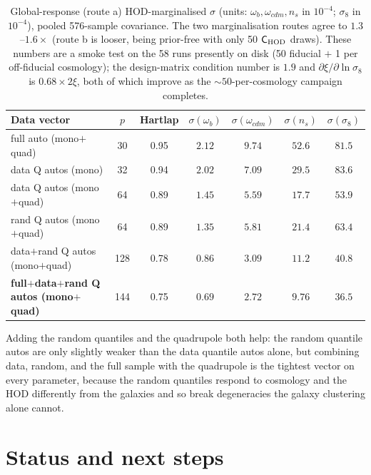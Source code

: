 \documentclass[11pt]{article}
\begin{document}
\begin{table}[ht]
\centering
\begin{tabular}{lcccccc}
\toprule
Data vector & $p$ & Hartlap & $\sigma(\omega_b)$ & $\sigma(\omega_{cdm})$ & $\sigma(n_s)$ & $\sigma(\sigma_8)$ \\
\midrule
full auto (mono$+$quad)                 & 30  & 0.95 & $2.12$ & $9.74$ & $52.6$ & $81.5$ \\
data Q autos (mono)                     & 32  & 0.94 & $2.02$ & $7.09$ & $29.5$ & $83.6$ \\
data Q autos (mono$+$quad)              & 64  & 0.89 & $1.45$ & $5.59$ & $17.7$ & $53.9$ \\
rand Q autos (mono$+$quad)              & 64  & 0.89 & $1.35$ & $5.81$ & $21.4$ & $63.4$ \\
data$+$rand Q autos (mono$+$quad)       & 128 & 0.78 & $0.86$ & $3.09$ & $11.2$ & $40.8$ \\
\textbf{full$+$data$+$rand Q autos (mono$+$quad)} & 144 & 0.75 & $\mathbf{0.69}$ & $\mathbf{2.72}$ & $\mathbf{9.76}$ & $\mathbf{36.5}$ \\
\bottomrule
\end{tabular}
\caption{Global-response (route a) HOD-marginalised $\sigma$ (units:
$\omega_b,\omega_{cdm},n_s$ in $10^{-4}$; $\sigma_8$ in $10^{-4}$), pooled
576-sample covariance.  The two marginalisation routes agree to
$1.3$--$1.6\times$ (route b is looser, being prior-free with only 50
$\mathsf{C}_{\rm HOD}$ draws).  These numbers are a smoke test on the 58
runs presently on disk (50 fiducial $+$ 1 per off-fiducial cosmology); the
design-matrix condition number is $1.9$ and $\partial\xi/\partial
\ln\sigma_8$ is $0.68\times 2\xi$, both of which improve as the
$\sim 50$-per-cosmology campaign completes.}
\label{tab:global}
\end{table}

Adding the random quantiles and the quadrupole both help: the random
quantile autos are only slightly weaker than the data quantile autos alone,
but combining data, random, and the full sample with the quadrupole is the
tightest vector on every parameter, because the random quantiles respond to
cosmology and the HOD differently from the galaxies and so break
degeneracies the galaxy clustering alone cannot.

\section{Status and next steps}
\label{sec:status}
\end{document}
